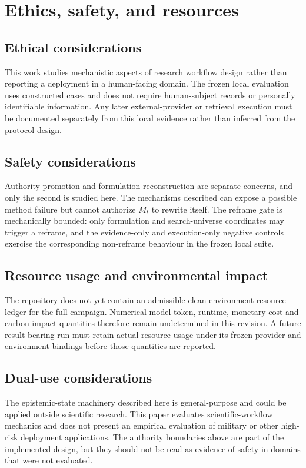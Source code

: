 \section{Ethics, safety, and resources}

\subsection{Ethical considerations}
This work studies mechanistic aspects of research workflow design rather than
reporting a deployment in a human-facing domain. The frozen local evaluation
uses constructed cases and does not require human-subject records or personally
identifiable information. Any later external-provider or retrieval execution
must be documented separately from this local evidence rather than inferred from
the protocol design.

\subsection{Safety considerations}
Authority promotion and formulation reconstruction are separate concerns, and
only the second is studied here. The mechanisms described can expose a possible
method failure but cannot authorize $M_t$ to rewrite itself. The reframe gate is
mechanically bounded: only formulation and search-universe coordinates may
trigger a reframe, and the evidence-only and execution-only negative controls
exercise the corresponding non-reframe behaviour in the frozen local suite.

\subsection{Resource usage and environmental impact}
The repository does not yet contain an admissible clean-environment resource
ledger for the full campaign. Numerical model-token, runtime, monetary-cost and
carbon-impact quantities therefore remain undetermined in this revision. A
future result-bearing run must retain actual resource usage under its frozen
provider and environment bindings before those quantities are reported.

\subsection{Dual-use considerations}
The epistemic-state machinery described here is general-purpose and could be
applied outside scientific research. This paper evaluates scientific-workflow
mechanics and does not present an empirical evaluation of military or other
high-risk deployment applications. The authority boundaries above are part of
the implemented design, but they should not be read as evidence of safety in
domains that were not evaluated.
